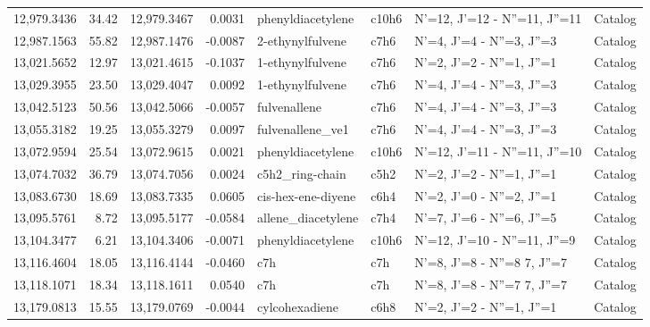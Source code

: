 \begin{longtable}{rrrrllll}
12,979.3436 &     34.42 &       12,979.3467 &    0.0031 &           phenyldiacetylene &   c10h6 &        N'=12, J'=12 - N''=11, J''=11 &    Catalog \\
12,987.1563 &     55.82 &       12,987.1476 &   -0.0087 &            2-ethynylfulvene &    c7h6 &            N'=4, J'=4 - N''=3, J''=3 &    Catalog \\
13,021.5652 &     12.97 &       13,021.4615 &   -0.1037 &            1-ethynylfulvene &    c7h6 &            N'=2, J'=2 - N''=1, J''=1 &    Catalog \\
13,029.3955 &     23.50 &       13,029.4047 &    0.0092 &            1-ethynylfulvene &    c7h6 &            N'=4, J'=4 - N''=3, J''=3 &    Catalog \\
13,042.5123 &     50.56 &       13,042.5066 &   -0.0057 &                fulvenallene &    c7h6 &            N'=4, J'=4 - N''=3, J''=3 &    Catalog \\
13,055.3182 &     19.25 &       13,055.3279 &    0.0097 &            fulvenallene_ve1 &    c7h6 &            N'=4, J'=4 - N''=3, J''=3 &    Catalog \\
13,072.9594 &     25.54 &       13,072.9615 &    0.0021 &           phenyldiacetylene &   c10h6 &        N'=12, J'=11 - N''=11, J''=10 &    Catalog \\
13,074.7032 &     36.79 &       13,074.7056 &    0.0024 &             c5h2_ring-chain &    c5h2 &            N'=2, J'=2 - N''=1, J''=1 &    Catalog \\
13,083.6730 &     18.69 &       13,083.7335 &    0.0605 &          cis-hex-ene-diyene &    c6h4 &            N'=2, J'=0 - N''=2, J''=1 &    Catalog \\
13,095.5761 &      8.72 &       13,095.5177 &   -0.0584 &          allene_diacetylene &    c7h4 &            N'=7, J'=6 - N''=6, J''=5 &    Catalog \\
13,104.3477 &      6.21 &       13,104.3406 &   -0.0071 &           phenyldiacetylene &   c10h6 &         N'=12, J'=10 - N''=11, J''=9 &    Catalog \\
13,116.4604 &     18.05 &       13,116.4144 &   -0.0460 &                         c7h &     c7h &      N'=8, J'=8 - N''=8     7, J''=7 &    Catalog \\
13,118.1071 &     18.34 &       13,118.1611 &    0.0540 &                         c7h &     c7h &      N'=8, J'=8 - N''=7     7, J''=7 &    Catalog \\
13,179.0813 &     15.55 &       13,179.0769 &   -0.0044 &              cylcohexadiene &    c6h8 &            N'=2, J'=2 - N''=1, J''=1 &    Catalog \\

\end{longtable}
